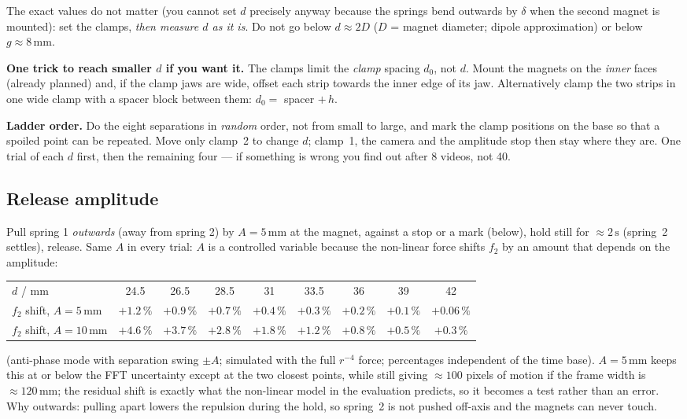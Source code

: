 \documentclass[11pt,a4paper]{article}
\newcommand{\un}[1]{\,\mathrm{#1}}
\begin{document}
The exact values do not matter (you cannot set $d$ precisely anyway because the springs bend outwards by $\delta$ when the second magnet is mounted): set the clamps, \emph{then measure $d$ as it is}. Do not go below $d\approx2D$ ($D$ = magnet diameter; dipole approximation) or below $g\approx8\un{mm}$.

\begin{tip}
\textbf{One trick to reach smaller $d$ if you want it.} The clamps limit the \emph{clamp} spacing $d_0$, not $d$. Mount the magnets on the \emph{inner} faces (already planned) and, if the clamp jaws are wide, offset each strip towards the inner edge of its jaw. Alternatively clamp the two strips in one wide clamp with a spacer block between them: $d_0=$ spacer $+\,h$.
\end{tip}

\begin{tip}
\textbf{Ladder order.} Do the eight separations in \emph{random} order, not from small to large, and mark the clamp positions on the base so that a spoiled point can be repeated. Move only clamp~2 to change $d$; clamp~1, the camera and the amplitude stop then stay where they are. One trial of each $d$ first, then the remaining four --- if something is wrong you find out after 8 videos, not 40.
\end{tip}

\subsection*{Release amplitude}
Pull spring 1 \emph{outwards} (away from spring 2) by $A=5\un{mm}$ at the magnet, against a stop or a mark (below), hold still for $\approx2\un{s}$ (spring~2 settles), release. Same $A$ in every trial: $A$ is a controlled variable because the non-linear force shifts $f_2$ by an amount that depends on the amplitude:
\begin{center}\small
\begin{tabular}{@{}lcccccccc@{}}
\toprule
$d$ / mm & 24.5 & 26.5 & 28.5 & 31 & 33.5 & 36 & 39 & 42\\
$f_2$ shift, $A=5\un{mm}$ & $+1.2\,\%$ & $+0.9\,\%$ & $+0.7\,\%$ & $+0.4\,\%$ & $+0.3\,\%$ & $+0.2\,\%$ & $+0.1\,\%$ & $+0.06\,\%$\\
$f_2$ shift, $A=10\un{mm}$ & $+4.6\,\%$ & $+3.7\,\%$ & $+2.8\,\%$ & $+1.8\,\%$ & $+1.2\,\%$ & $+0.8\,\%$ & $+0.5\,\%$ & $+0.3\,\%$\\
\bottomrule
\end{tabular}
\end{center}
(anti-phase mode with separation swing $\pm A$; simulated with the full $r^{-4}$ force; percentages independent of the time base). $A=5\un{mm}$ keeps this at or below the FFT uncertainty except at the two closest points, while still giving $\approx100$ pixels of motion if the frame width is $\approx120\un{mm}$; the residual shift is exactly what the non-linear model in the evaluation predicts, so it becomes a test rather than an error. Why outwards: pulling apart lowers the repulsion during the hold, so spring~2 is not pushed off-axis and the magnets can never touch.
\end{document}
